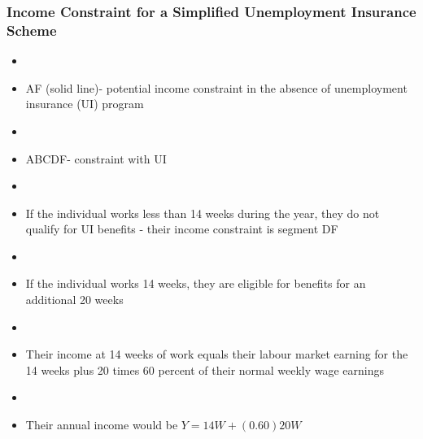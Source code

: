 \documentclass[blue]{beamer}
\begin{document}
 
 \begin{frame} \frametitle{Income Constraint for a Simplified Unemployment Insurance Scheme}


\begin{itemize}
\item[]
\item AF (solid line)- potential income constraint in the absence of unemployment insurance (UI) program

\item[]
\item ABCDF- constraint with UI

\item[]
\item If the individual works less than 14 weeks during the year,  they do not qualify for UI benefits - their income constraint is segment DF
\item[]
\item If the individual works 14 weeks,  they are eligible for benefits for an additional 20 weeks
\item[]
\item Their income at 14 weeks of work equals their labour market earning for the 14 weeks plus 20 times 60 percent of their normal weekly wage earnings
\item[]
\item Their annual income would be $Y=14W +(0.60)20W$
 \end{itemize}
 \end{frame}
 
 
 
\end{document}
